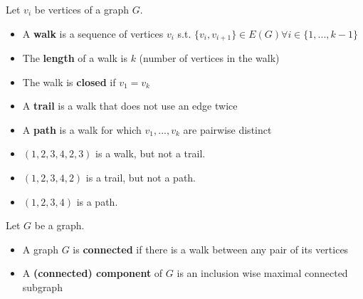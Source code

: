 \begin{definition}\label{1.9}
    Let $v_i$ be vertices of a graph $G$.
    \begin{itemize}
        \item A \textbf{walk} is a sequence of vertices $v_i$ s.t.
        $\{v_i,v_{i+1}\}\in E(G) \forall i\in \{1,...,k-1\}$
        \item The \textbf{length} of a walk is $k$ (number of vertices in
        the walk)
        \item The walk is \textbf{closed} if $v_1=v_k$
        \item A \textbf{trail} is a walk that does not use an edge twice
        \item A \textbf{path} is a walk for which $v_1,...,v_k$ are pairwise
        distinct
    \end{itemize}
    \begin{center}
        \end{center}
        \begin{itemize}
            \item $(1,2,3,4,2,3)$ is a walk, but not a trail.
            \item $(1,2,3,4,2)$ is a trail, but not a path.
            \item $(1,2,3,4)$ is a path.
        \end{itemize}
\end{definition}

\medskip

\begin{definition} \label{1.10}
    Let $G$ be a graph.
    \begin{itemize}
        \item A graph $G$ is \textbf{connected} if there is a
        walk between any pair of its vertices
        \item A \textbf{(connected) component} of $G$ is an inclusion
        wise maximal connected subgraph
    \end{itemize}
\end{definition}




